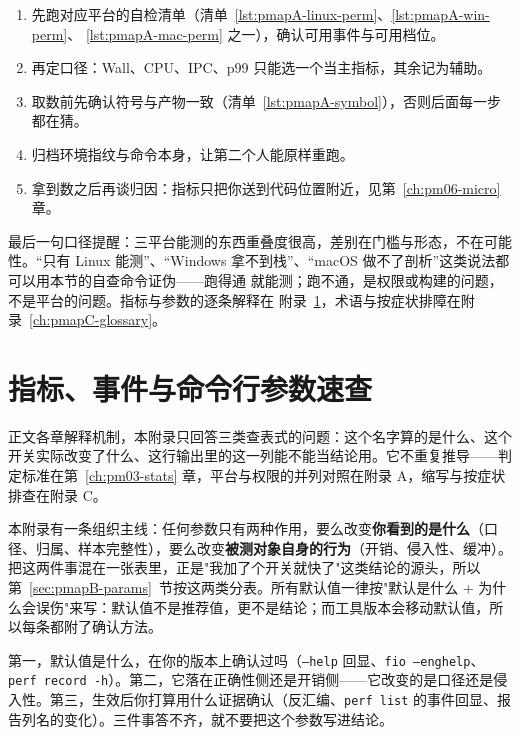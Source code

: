 \documentclass[12pt,a4paper,fontset=fandol]{ctexbook}
\newcommand{\Tp}[1]{\texttt{#1}}
\newcommand{\Lang}[1]{\textsf{#1}}
\newcommand{\MWall}{\Lang{Wall}}
\newcommand{\MCpu}{\Lang{CPU}}
\newcommand{\Mx}[1]{\textsf{#1}}
\begin{document}
\begin{guideline}[title={跨平台通用的起手式}]
\begin{enumerate}
  \item 先跑对应平台的自检清单（清单~\ref{lst:pmapA-linux-perm}、\ref{lst:pmapA-win-perm}、
        \ref{lst:pmapA-mac-perm} 之一），确认可用事件与可用档位。
  \item 再定口径：\MWall、\MCpu、\Mx{IPC}、\Mx{p99} 只能选一个当主指标，其余记为辅助。
  \item 取数前先确认符号与产物一致（清单~\ref{lst:pmapA-symbol}），否则后面每一步都在猜。
  \item 归档环境指纹与命令本身，让第二个人能原样重跑。
  \item 拿到数之后再谈归因：指标只把你送到代码位置附近，见第~\ref{ch:pm06-micro} 章。
\end{enumerate}
\end{guideline}

最后一句口径提醒：三平台能测的东西重叠度很高，差别在门槛与形态，不在可能性。``只有 Linux
能测''、``Windows 拿不到栈''、``macOS 做不了剖析''这类说法都可以用本节的自查命令证伪——跑得通
就能测；跑不通，是权限或构建的问题，不是平台的问题。指标与参数的逐条解释在
附录~\ref{ch:pmapB-params}，术语与按症状排障在附录~\ref{ch:pmapC-glossary}。

\chapter{指标、事件与命令行参数速查}
\label{ch:pmapB-params}

正文各章解释机制，本附录只回答三类查表式的问题：这个名字算的是什么、这个开关实际改变了什么、这行输出里的这一列能不能当结论用。它不重复推导——判定标准在第~\ref{ch:pm03-stats} 章，平台与权限的并列对照在附录 A，缩写与按症状排查在附录 C。

本附录有一条组织主线：任何参数只有两种作用，要么改变\textbf{你看到的是什么}（口径、归属、样本完整性），要么改变\textbf{被测对象自身的行为}（开销、侵入性、缓冲）。把这两件事混在一张表里，正是"我加了个开关就快了"这类结论的源头，所以第~\ref{sec:pmapB-params}~节按这两类分表。所有默认值一律按"默认是什么 + 为什么会误伤"来写：默认值不是推荐值，更不是结论；而工具版本会移动默认值，所以每条都附了确认方法。

\begin{guideline}[title={查一个参数只需要问三件事}]
第一，默认值是什么，在你的版本上确认过吗（\Tp{--help} 回显、\Tp{fio --enghelp}、\Tp{perf record -h}）。第二，它落在正确性侧还是开销侧——它改变的是口径还是侵入性。第三，生效后你打算用什么证据确认（反汇编、\Tp{perf list} 的事件回显、报告列名的变化）。三件事答不齐，就不要把这个参数写进结论。
\end{guideline}
\end{document}
